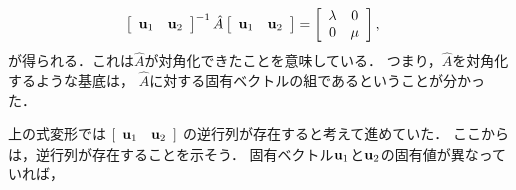 %
\begin{align}
\left[\begin{array}{cc}
{\bf u}_{1} & {\bf u}_{2}\end{array}\right]^{-1}\hat{A}\left[\begin{array}{cc}
{\bf u}_{1} & {\bf u}_{2}\end{array}\right] & =\left[\begin{array}{cc}
\lambda & 0\\
0 & \mu
\end{array}\right], 
\end{align}
が得られる．これは$\hat{A}$が対角化できたことを意味している．
つまり，$\hat{A}$を対角化するような基底は，
$\hat{A}$に対する固有ベクトルの組であるということが分かった．
%

上の式変形では
$[
\begin{array}{cc}
 {\bf u}_{1} & {\bf u}_{2} \\
\end{array}
]$
の逆行列が存在すると考えて進めていた．
ここからは，逆行列が存在することを示そう．
固有ベクトル${\bf u}_{1}$と${\bf u}_{2}$の固有値が異なっていれば，
